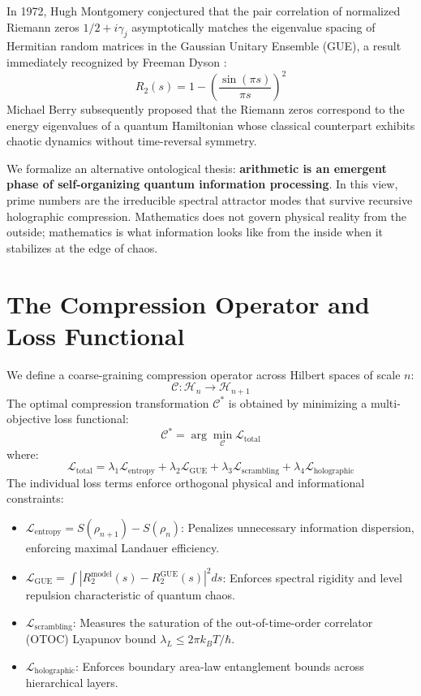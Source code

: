 \documentclass[11pt,a4paper]{article}
\begin{document}
In 1972, Hugh Montgomery \cite{montgomery1973pair} conjectured that the pair correlation of normalized Riemann zeros $1/2 + i\gamma_j$ asymptotically matches the eigenvalue spacing of Hermitian random matrices in the Gaussian Unitary Ensemble (GUE), a result immediately recognized by Freeman Dyson \cite{dyson1962statistical}:
\begin{equation}
R_2(s) = 1 - \left(\frac{\sin(\pi s)}{\pi s}\right)^2
\end{equation}
Michael Berry \cite{berry1986riemann} subsequently proposed that the Riemann zeros correspond to the energy eigenvalues of a quantum Hamiltonian whose classical counterpart exhibits chaotic dynamics without time-reversal symmetry.

We formalize an alternative ontological thesis: \textbf{arithmetic is an emergent phase of self-organizing quantum information processing}. In this view, prime numbers are the irreducible spectral attractor modes that survive recursive holographic compression. Mathematics does not govern physical reality from the outside; mathematics is what information looks like from the inside when it stabilizes at the edge of chaos.

\section{The Compression Operator and Loss Functional}
We define a coarse-graining compression operator across Hilbert spaces of scale $n$:
\begin{equation}
\mathcal{C} : \mathcal{H}_n \longrightarrow \mathcal{H}_{n+1}
\end{equation}
The optimal compression transformation $\mathcal{C}^*$ is obtained by minimizing a multi-objective loss functional:
\begin{equation}
\mathcal{C}^* = \arg\min_{\mathcal{C}} \mathcal{L}_{\text{total}}
\end{equation}
where:
\begin{equation}
\mathcal{L}_{\text{total}} = \lambda_1 \mathcal{L}_{\text{entropy}} + \lambda_2 \mathcal{L}_{\text{GUE}} + \lambda_3 \mathcal{L}_{\text{scrambling}} + \lambda_4 \mathcal{L}_{\text{holographic}}
\end{equation}
The individual loss terms enforce orthogonal physical and informational constraints:
\begin{itemize}
    \item $\mathcal{L}_{\text{entropy}} = S(\rho_{n+1}) - S(\rho_n)$: Penalizes unnecessary information dispersion, enforcing maximal Landauer efficiency.
    \item $\mathcal{L}_{\text{GUE}} = \int |R_2^{\text{model}}(s) - R_2^{\text{GUE}}(s)|^2 ds$: Enforces spectral rigidity and level repulsion characteristic of quantum chaos.
    \item $\mathcal{L}_{\text{scrambling}}$: Measures the saturation of the out-of-time-order correlator (OTOC) Lyapunov bound $\lambda_L \le 2\pi k_B T / \hbar$.
    \item $\mathcal{L}_{\text{holographic}}$: Enforces boundary area-law entanglement bounds across hierarchical layers.
\end{itemize}
\end{document}
